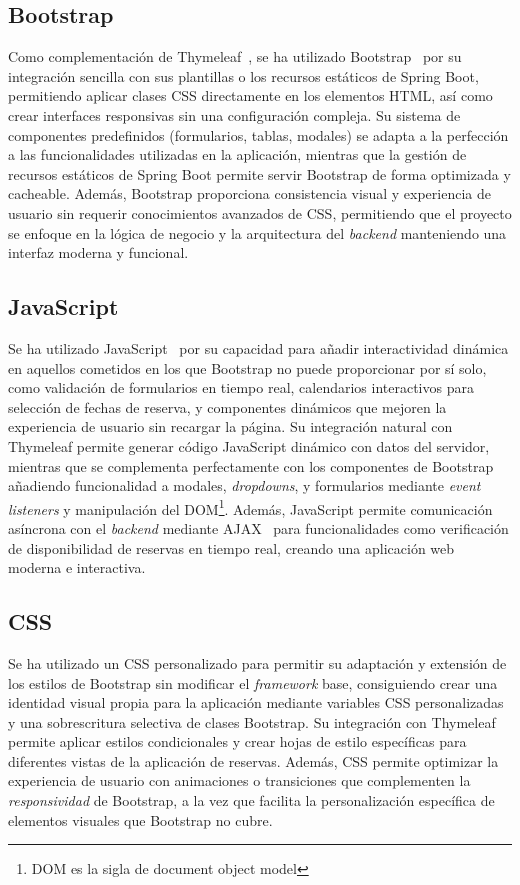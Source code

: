 \subsection{Bootstrap}\label{bootstrap}
Como complementación de Thymeleaf~\cite{thymeleaf}, se ha utilizado Bootstrap~\cite{bootstrap} por su integración sencilla con sus plantillas o los recursos estáticos de Spring Boot, permitiendo aplicar clases CSS directamente en los elementos HTML, así como crear interfaces responsivas sin una configuración compleja. Su sistema de componentes predefinidos (formularios, tablas, modales) se adapta a la perfección a las funcionalidades utilizadas en la aplicación, mientras que la gestión de recursos estáticos de Spring Boot permite servir Bootstrap de forma optimizada y cacheable. Además, Bootstrap proporciona consistencia visual y experiencia de usuario sin requerir conocimientos avanzados de CSS, permitiendo que el proyecto se enfoque en la lógica de negocio y la arquitectura del \emph{backend} manteniendo una interfaz moderna y funcional.

\subsection{JavaScript}\label{javascript}
Se ha utilizado JavaScript~\cite{javascript} por su capacidad para añadir interactividad dinámica en aquellos cometidos en los que Bootstrap no puede proporcionar por sí solo, como validación de formularios en tiempo real, calendarios interactivos para selección de fechas de reserva, y componentes dinámicos que mejoren la experiencia de usuario sin recargar la página. Su integración natural con Thymeleaf permite generar código JavaScript dinámico con datos del servidor, mientras que se complementa perfectamente con los componentes de Bootstrap añadiendo funcionalidad a modales, \emph{dropdowns}, y formularios mediante \emph{event listeners} y manipulación del DOM\footnote{DOM es la sigla de document object model}. Además, JavaScript permite comunicación asíncrona con el \emph{backend} mediante AJAX~\cite{ajax} para funcionalidades como verificación de disponibilidad de reservas en tiempo real, creando una aplicación web moderna e interactiva.

\subsection{CSS}\label{css}
Se ha utilizado un CSS personalizado para permitir su adaptación y extensión de los estilos de Bootstrap sin modificar el \emph{framework} base, consiguiendo crear una identidad visual propia para la aplicación mediante variables CSS personalizadas y una sobrescritura selectiva de clases Bootstrap. Su integración con Thymeleaf permite aplicar estilos condicionales y crear hojas de estilo específicas para diferentes vistas de la aplicación de reservas. Además, CSS permite optimizar la experiencia de usuario con animaciones o transiciones que complementen la \emph{responsividad} de Bootstrap, a la vez que facilita la personalización específica de elementos visuales que Bootstrap no cubre.

